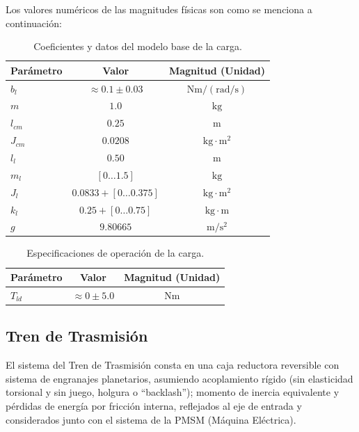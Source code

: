 \documentclass[blue,fullpaper]{ludusofficial}  %
\begin{document}
Los valores numéricos de las magnitudes físicas son como se menciona a continuación:

\begin{table}[htbp]
    \centering
    \caption{Coeficientes y datos del modelo base de la carga.}
    \label{tab:parametros_carga}
    \begin{tabular}{lcc}
        \hline
        \textbf{Parámetro} & \textbf{Valor} & \textbf{Magnitud (Unidad)} \\
        \hline
        $b_l$ & $\approx 0.1 \pm 0.03$ & $\mathrm{Nm / (rad/s)}$ \\
        $m$ & $1.0$ & $\mathrm{kg}$ \\
        $l_{cm}$ & $0.25$ & $\mathrm{m}$ \\
        $J_{cm}$ & $0.0208$ & $\mathrm{kg \cdot m^{2}}$ \\
        $l_l$ & $0.50$ & $\mathrm{m}$ \\
        $m_l$ & $[0 \dots 1.5]$ & $\mathrm{kg}$ \\
        $J_l$ & $0.0833 + [0 \dots 0.375]$ & $\mathrm{kg \cdot m^{2}}$ \\
        $k_l$ & $0.25 + [0 \dots 0.75]$ & $\mathrm{kg \cdot m}$ \\
        $g$ & $9.80665$ & $\mathrm{m/s^2}$ \\
        \hline
    \end{tabular}
\end{table}

\begin{table}[htbp]
    \centering
    \caption{Especificaciones de operación de la carga.}
    \label{tab:parametros_carga}
    \begin{tabular}{lcc}
        \hline
        \textbf{Parámetro} & \textbf{Valor} & \textbf{Magnitud (Unidad)} \\
        \hline
        $T_{ld}$ & $\approx 0 \pm 5.0$ & $\mathrm{Nm}$ \\
        \hline
    \end{tabular}
\end{table}


\subsection{Tren de Trasmisión}

El sistema del Tren de Trasmisión consta en una caja reductora reversible con sistema de engranajes planetarios, asumiendo acoplamiento rígido (sin elasticidad torsional y sin juego, holgura o “backlash”); momento de inercia equivalente y pérdidas de energía por fricción interna, reflejados al eje de entrada y considerados junto con el sistema de la PMSM (Máquina Eléctrica).
\end{document}
